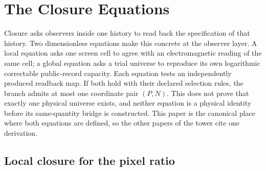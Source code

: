 \section{The Closure Equations}
\label{sec:closure-equations}

Closure asks observers inside one history to read back the specification of
that history. Two dimensionless equations make this concrete at the observer
layer. A local equation asks one screen cell to agree with an
electromagnetic reading of the same cell; a global equation asks a trial
universe to reproduce its own logarithmic correctable public-record capacity.
Each equation tests an independently produced readback map. If both hold with
their declared selection rules, the branch admits at most one coordinate pair
\((P,N)\). This does not prove that exactly one physical universe exists, and
neither equation is a physical identity before its same-quantity bridge is
constructed. This paper is the canonical place where both equations are
defined, so the other papers of the tower cite one derivation.

\subsection{Local closure for the pixel ratio}
\label{sec:p-closure}

